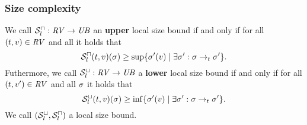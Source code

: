 \subsubsection{Size complexity}


\begin{definition}
  We call ${\mathcal{S}^\sqcap_l}: \mathit{RV} \rightarrow \mathit{UB}$ an \textbf{upper} local size bound if and only if for all $(t, v) \in \mathit{RV}$ and all  it holds that
  \[ {\mathcal{S}^\sqcap_l}(t, v)(\sigma) \geq \sup \lbrace \sigma'(v) \mid \exists \sigma': \sigma \rightarrow_t \sigma' \rbrace. \]
  Futhermore, we call ${\mathcal{S}^\sqcup_l}: \mathit{RV} \rightarrow \mathit{UB}$ a \textbf{lower} local size bound if and only if for all $(t, v') \in \mathit{RV}$ and all $\sigma$ it holds that
  \[ {\mathcal{S}^\sqcup_l}(t, v)(\sigma) \geq \inf \lbrace \sigma'(v) \mid \exists \sigma': \sigma \rightarrow_t \sigma' \rbrace. \]
  We call ${({\mathcal{S}^\sqcup_l}, {\mathcal{S}^\sqcap_l})}$ a local size bound.
\end{definition}

